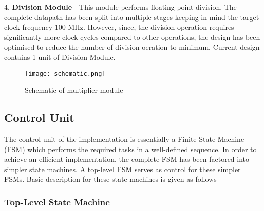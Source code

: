 4. {\bf Division Module} - This module performs floating point division. The complete datapath has been split into multiple stages keeping in mind the target clock frequency 100 MHz. However, since, the division operation requires significantly more clock cycles compared to other operations, the design has been optimised to reduce the number of division oeration to minimum. Current design contains 1 unit of Division Module.

\begin{figure}[H]
\centering
\texttt{[image: schematic.png]}
\caption{Schematic of multiplier module}\label{fig:schematic}
\end{figure}

\subsection{Control Unit}
The control unit of the implementation is essentially a Finite State Machine (FSM) which performs the required tasks in a well-defined sequence. In order to achieve an efficient implementation, the complete FSM has been factored into simpler state machines. A top-level FSM serves as control for these simpler FSMs. Basic description for these state machines is given as follows -

\subsubsection{Top-Level State Machine}


